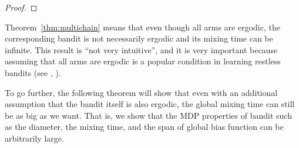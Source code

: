 \begin{proof}

\end{proof}

Theorem~\ref{thm:multichain} means that even though all arms are ergodic, the corresponding bandit is not necessarily ergodic and its mixing time can be infinite.
This result is ``not very intuitive'', and it is very important because assuming that all arms are ergodic is a popular condition in learning restless bandits (see \eg, \cite{ortner2012regret, jung2019thompson}).

To go further, the following theorem will show that even with an additional assumption that the bandit itself is also ergodic, the global mixing time can still be as big as we want.
That is, we show that the MDP properties of bandit such as the diameter, the mixing time, and the span of global bias function can be arbitrarily large.

